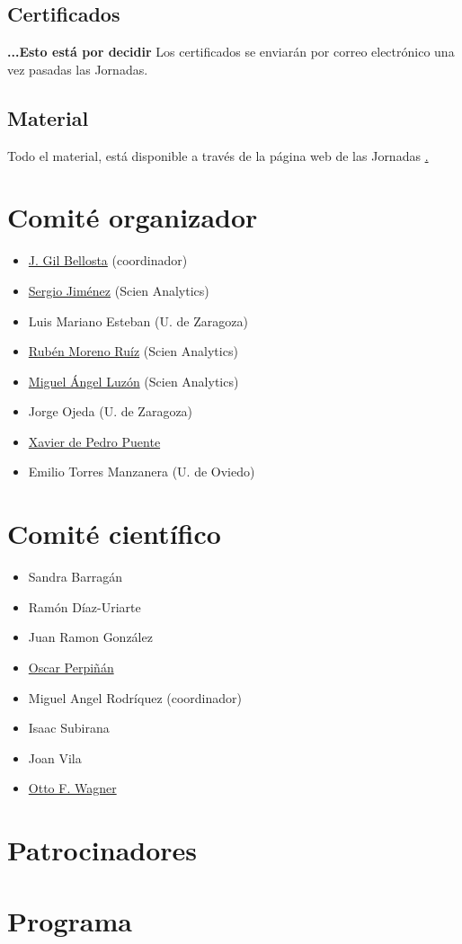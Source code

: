 \section{Certificados}
\textbf{...Esto está por decidir}
Los certificados se enviarán por correo electrónico una vez pasadas
las Jornadas.  

\section{Material}

Todo el material, está disponible a través de la página web de las Jornadas 
\href{http://r-es.org/V+Jornadas}. 



\chapter{Comité organizador}

\begin{itemize}

\item \href{http://www.datanalytics.com}{J. Gil Bellosta} (coordinador)
\item \href{http://www.scien-analytics.com}{Sergio Jiménez} (Scien Analytics)
\item Luis Mariano Esteban (U. de Zaragoza)
\item \href{http://www.scien-analytics.com}{Rubén Moreno Ruíz} (Scien Analytics)
\item \href{[http://www.scien-analytics.com}{Miguel Ángel Luzón} (Scien Analytics)
\item Jorge Ojeda (U. de Zaragoza)
\item \href{http://ueb.vhir.org|Vall d'Hebron Research Institute}{Xavier de Pedro Puente}
\item  Emilio Torres Manzanera (U. de Oviedo)
\end{itemize}

\chapter{Comité científico}


\begin{itemize}

\item Sandra Barragán
\item Ramón Díaz-Uriarte
\item Juan Ramon González
\item \href{http://oscarperpinan.github.io}{Oscar Perpiñán}
\item Miguel Angel Rodríquez (coordinador)
\item Isaac Subirana
\item Joan Vila
\item \href{http://www.ottofwagner.es}{Otto F. Wagner}

\end{itemize}


\chapter{Patrocinadores}



\chapter{Programa}



